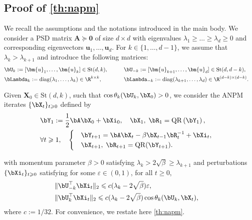 \documentclass{article}
\theoremstyle{plain}
\theoremstyle{definition}
\theoremstyle{remark}
\begin{document}
\subsection{Proof of \cref{th:napm}}\label{appdx:napm}

We recall the assumptions and the notations introduced in the main body. We consider a PSD matrix $\mathbf{A} \succeq \mathbf{0}$ of size $d\times d$ with eigenvalues $\lambda_1 \geqslant \dots \geqslant \lambda_d \geqslant 0$ and corresponding eigenvectors $\mathbf{u}_1, \dots, \mathbf{u}_d$. For $k \in \{1,\dots,d-1\}$, we assume that $\lambda_k > \lambda_{k+1}$ and introduce the following matrices:
\begin{align*}
  & \bU_k := [\bm{u}_1, \dots, \bm{u}_k] \in \mathrm{St}(d,k), \qquad &&\bU_{-k} := [\bm{u}_{k+1}, \dots, \bm{u}_d] \in \mathrm{St}(d,d-k), \\
  & \bLambda_k := \mathrm{diag}(\lambda_1, \dots, \lambda_k) \in \R^{k\times k}, \qquad &&\bLambda_{-k} := \mathrm{diag}(\lambda_{k+1}, \dots, \lambda_d) \in \R^{(d-k)\times (d-k)}.
\end{align*}

Given $\mathbf{X}_0 \in \mathrm{St}(d, k)$, such that $\cos \theta_k(\bU_k, \bX_0) > 0$, we consider the ANPM iterates $\{\bX_t\}_{t\geqslant 0}$ defined by
\begin{align}
  & \bY_1 := \frac{1}{2}\bA \bX_0 + \bXi_0, \quad \bX_1,\; \bR_1 = \mathrm{QR}\left(\bY_1\right), \label{eq:qrx1r1}  \\
  & \forall t \geqslant 1, \quad \begin{cases}
    & \bY_{t+1} = \bA \bX_t - \beta \bX_{t-1}\bR_t^{-1} + \bXi_t, \\
    & \bX_{t+1}, \;\bR_{t+1} = \mathrm{QR}(\bY_{t+1}).
  \end{cases} \label{eq:anpm_appdx}
\end{align}

with momentum parameter $\beta > 0$ satisfying $\lambda_k > 2\sqrt{\beta} \geqslant \lambda_{k+1}$ and perturbations $\{\bXi_t\}_{t\geqslant 0}$ satisfying for some $\varepsilon\in(0,1)$, for all $t\geqslant 0$,
\begin{align}
    & \Vert \bU_{-k}^\top\bXi_t \Vert_2 \leqslant c(\lambda_k - 2\sqrt{\beta})\varepsilon ,\label{eq:noisecond1} \\
    & \Vert \bU_k^\top \bXi_t \Vert_2 \leqslant c (\lambda_k - 2\sqrt{\beta}) \cos\theta_k(\bU_k, \bX_t), \label{eq:noisecond2}
\end{align}
where $c:=1/32$. For convenience, we restate here \cref{th:napm}.
\end{document}
